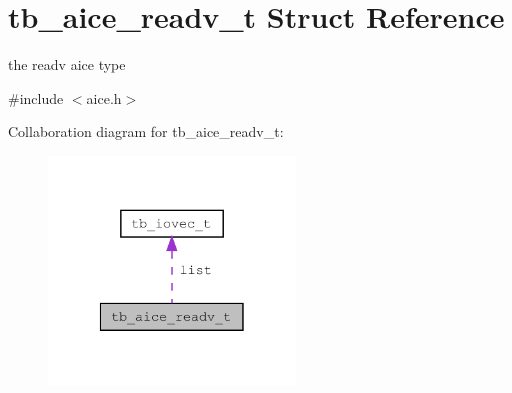 \hypertarget{structtb__aice__readv__t}{\section{tb\-\_\-aice\-\_\-readv\-\_\-t Struct Reference}
\label{structtb__aice__readv__t}
}


the readv aice type  




{\ttfamily \#include $<$aice.\-h$>$}



Collaboration diagram for tb\-\_\-aice\-\_\-readv\-\_\-t\-:\nopagebreak
\begin{figure}[H]
\begin{center}
\leavevmode
\includegraphics[width=186pt]{d3/d92/structtb__aice__readv__t__coll__graph}
\end{center}
\end{figure}
